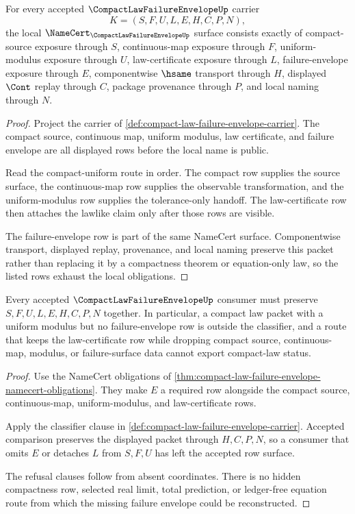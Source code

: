 \begin{theorem}
\label{thm:compact-law-failure-envelope-namecert-obligations}
For every accepted $\CompactLawFailureEnvelopeUp$ carrier
$$
K=(S,F,U,L,E,H,C,P,N),
$$
the local $\NameCert_{\CompactLawFailureEnvelopeUp}$ surface consists exactly of compact-source exposure through $S$, continuous-map exposure through $F$, uniform-modulus exposure through $U$, law-certificate exposure through $L$, failure-envelope exposure through $E$, componentwise $\hsame$ transport through $H$, displayed $\Cont$ replay through $C$, package provenance through $P$, and local naming through $N$.
\end{theorem}
\begin{proof}
Project the carrier of \autoref{def:compact-law-failure-envelope-carrier}. The compact source, continuous map, uniform modulus, law certificate, and failure envelope are all displayed rows before the local name is public.

Read the compact-uniform route in order. The compact row supplies the source surface, the continuous-map row supplies the observable transformation, and the uniform-modulus row supplies the tolerance-only handoff. The law-certificate row then attaches the lawlike claim only after those rows are visible.

The failure-envelope row is part of the same NameCert surface. Componentwise transport, displayed replay, provenance, and local naming preserve this packet rather than replacing it by a compactness theorem or equation-only law, so the listed rows exhaust the local obligations.
\end{proof}

\begin{theorem}
\label{thm:compact-law-failure-envelope-classifier-boundary}
Every accepted $\CompactLawFailureEnvelopeUp$ consumer must preserve $S,F,U,L,E,H,C,P,N$ together. In particular, a compact law packet with a uniform modulus but no failure-envelope row is outside the classifier, and a route that keeps the law-certificate row while dropping compact source, continuous-map, modulus, or failure-surface data cannot export compact-law status.
\end{theorem}
\begin{proof}
Use the NameCert obligations of \autoref{thm:compact-law-failure-envelope-namecert-obligations}. They make $E$ a required row alongside the compact source, continuous-map, uniform-modulus, and law-certificate rows.

Apply the classifier clause in \autoref{def:compact-law-failure-envelope-carrier}. Accepted comparison preserves the displayed packet through $H,C,P,N$, so a consumer that omits $E$ or detaches $L$ from $S,F,U$ has left the accepted row surface.

The refusal clauses follow from absent coordinates. There is no hidden compactness row, selected real limit, total prediction, or ledger-free equation route from which the missing failure envelope could be reconstructed.
\end{proof}

